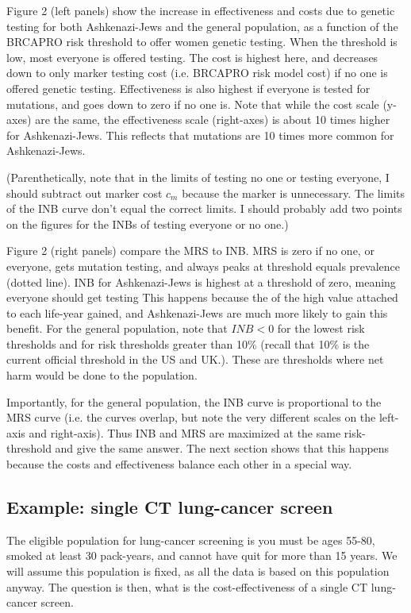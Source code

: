 \documentclass[11pt]{article}
\begin{document}
Figure 2 (left panels) show the increase in effectiveness and costs due to genetic testing for both Ashkenazi-Jews and the general population, as a function of the BRCAPRO risk threshold to offer women genetic testing.  When the threshold is low, most everyone is offered testing.  The cost is highest here, and decreases down to only marker testing cost (i.e. BRCAPRO risk model cost) if no one is offered genetic testing.  Effectiveness is also highest if everyone is tested for mutations, and goes down to zero if no one is.  Note that while the cost scale (y-axes) are the same, the effectiveness scale (right-axes) is about 10 times higher for Ashkenazi-Jews.  This reflects that mutations are 10 times more common for Ashkenazi-Jews.  

(Parenthetically, note that in the limits of testing no one or testing everyone, I should subtract out marker cost $c_m$ because the marker is unnecessary.  The limits of the INB curve don't equal the correct limits.  I should probably add two points on the figures for the INBs of testing everyone or no one.)

Figure 2 (right panels) compare the MRS to INB.  MRS is zero if no one, or everyone, gets mutation testing, and always peaks at threshold equals prevalence (dotted line).  INB for Ashkenazi-Jews is highest at a threshold of zero, meaning everyone should get testing  This happens because the of the high value attached to each life-year gained, and Ashkenazi-Jews are much more likely to gain this benefit.  For the general population, note that $INB<0$ for the lowest risk thresholds and for risk thresholds greater than 10\% (recall that 10\% is the current official threshold in the US and UK.).  These are thresholds where net harm would be done to the population.  

Importantly, for the general population, the INB curve is proportional to the MRS curve (i.e. the curves overlap, but note the very different scales on the left-axis and right-axis).  Thus INB and MRS are maximized at the same risk-threshold and give the same answer.  The next section shows that this happens because the costs and effectiveness balance each other in a special way.


\subsection{Example: single CT lung-cancer screen}

The eligible population for lung-cancer screening is you must be ages 55-80, smoked at least 30 pack-years, and cannot have quit for more than 15 years.  We will assume this population is fixed, as all the data is based on this population anyway.  The question is then, what is the cost-effectiveness of a single CT lung-cancer screen.
\end{document}
